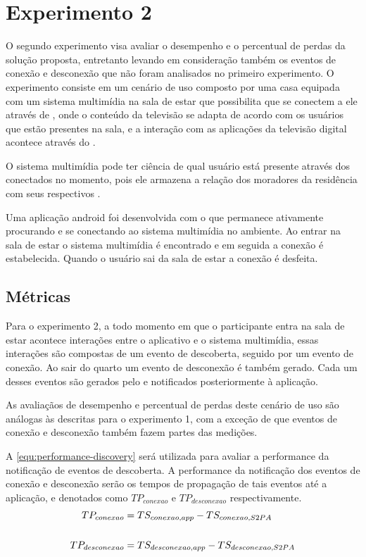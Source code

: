 \section{Experimento 2}

O segundo experimento visa avaliar o desempenho e o percentual de perdas da solução proposta, entretanto levando em consideração também os eventos de conexão e desconexão que não foram analisados no primeiro experimento. O experimento consiste em um cenário de uso composto por uma casa equipada com um sistema multimídia na sala de estar que possibilita que \smartphones se conectem a ele através de \bluetooth, onde o conteúdo da televisão se adapta de acordo com os usuários que estão presentes na sala, e a interação com as aplicações da televisão digital acontece através do \smartphone.

O sistema multimídia pode ter ciência de qual usuário está presente através dos \smartphones conectados no momento, pois ele armazena a relação dos moradores da residência com seus respectivos \smartphones.

Uma aplicação android foi desenvolvida com o \middleware \mhubcddl que permanece ativamente procurando e se conectando ao sistema multimídia no ambiente. Ao entrar na sala de estar o sistema multimídia é encontrado e em seguida a conexão é estabelecida. Quando o usuário sai da sala de estar a conexão é desfeita. 

\subsection{Métricas}

Para o experimento 2, a todo momento em que o participante entra na sala de estar acontece interações entre o aplicativo e o sistema multimídia, essas interações são compostas de um evento de descoberta, seguido por um evento de conexão. Ao sair do quarto um evento de desconexão é também gerado. Cada um desses eventos são gerados pelo \stwopa e notificados posteriormente à aplicação.

As avaliaçãos de desempenho e percentual de perdas deste cenário de uso são análogas às descritas para o experimento 1, com a exceção de que eventos de conexão e desconexão também fazem partes das medições.

A \autoref{equ:performance-discovery} será utilizada para avaliar a performance da notificação de eventos de descoberta. A performance da notificação dos eventos de conexão e desconexão serão os tempos de propagação de tais eventos até a aplicação, e denotados como $TP_{conexao}$ e $TP_{desconexao}$ respectivamente.
\begin{align}
	TP_{conexao} &= TS_{conexao,app} - TS_{conexao,S2PA} \label{equ:performance-connection} \\
	\nonumber\\
	TP_{desconexao} &= TS_{desconexao,app} - TS_{desconexao,S2PA} \label{equ:performance-disconnection}
\end{align}

